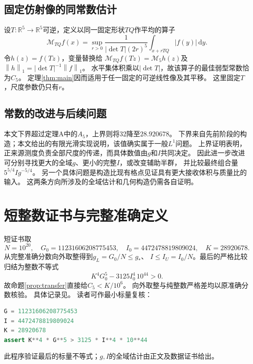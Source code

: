 \documentclass[UTF8,fontset=fandol,zihao=-4,a4paper]{ctexart}
\newcommand{\R}{\mathbb R}
\newcommand{\1}{\mathbf 1}
\newcommand{\dd}{\,\mathrm d}
\newcommand{\norm}[1]{\left\lVert#1\right\rVert}
\begin{document}
\subsection{固定仿射像的同常数估计}
设$T:\R^5\to\R^5$可逆，定义以同一固定形状$TQ$作平均的算子
\[
 \mathcal M_{TQ}f(x)=\sup_{r>0}\frac1{|\det T|(2r)^5}
 \int_{x+rTQ}|f(y)|\dd y.
\]
令$h(z)=f(Tz)$，变量替换给
$\mathcal M_{TQ}f(Tz)=\mathcal M_5h(z)$及
$\norm h_1=|\det T|^{-1}\norm f_1$。
水平集体积乘以$|\det T|$，故该算子的最佳弱型常数恰为$C_5$。
定理\ref{thm:main}因而适用于任一固定的可逆线性像及其平移。
这里固定$T$，尺度参数仍只有$r$。

\subsection{常数的改进与后续问题}
本文下界超过定理A中的$A_5$，上界则将$32$降至$28.920678$。
下界来自先前阶段的构造；本文给出的有限光滑实现说明，该值确实属于一般$L^1$问题。
上界证明表明，正来源测度负责全部尺度的传递，而具体数值由$g$和$I$共同决定。
因此进一步改进可分别寻找更大的全域$g$、更小的完整$I$，或改变辅助半群，
并比较最终组合量$5^{5/4}Ig^{-5/4}$。
另一个具体问题是构造比现有格点见证具有更大接收体积与质量比的输入。
这两条方向所涉及的全域估计和几何构造仍需各自证明。

\appendix
\section{短整数证书与完整准确定义}
短证书取
\[
 N=10^{20},\quad G_0=11231606208775453,\quad
 I_0=4472478819809024,\quad K=28920678.
\]
从完整准确分数向外取整得到$g_L=G_0/N\le g_*$、
$I\le I_U=I_0/N$。最后的严格比较归结为整数不等式
\[
 K^4G_0^5-3125I_0^4\,10^{44}>0.
\]
故命题\ref{prop:transfer}直接给$C_5<K/10^6$。
向外取整与纯整数严格差均以原准确分数核验。
具体记录见。
读者可作最小标量复核：
\begin{lstlisting}[language=Python]
G = 11231606208775453
I = 4472478819809024
K = 28920678
assert K**4 * G**5 > 3125 * I**4 * 10**44
\end{lstlisting}
此程序验证最后的标量不等式；$g,I$的全域估计由正文及数据证书给出。
\end{document}
